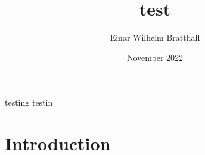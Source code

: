 \documentclass{report}
\title{test}
\author{Einar Wilhelm Bratthall}
\date{November 2022}
\begin{document}
    \begin{multicols*}{3}
        
        
        
    \end{multicols*}

\maketitle
testing testin
\section{Introduction}
\end{document}
